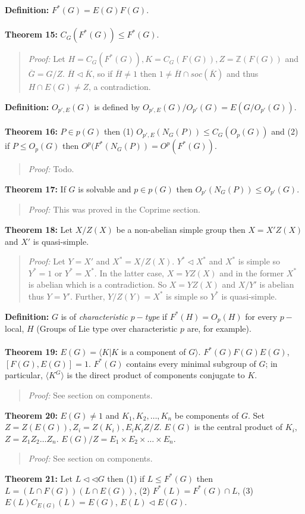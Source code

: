 {\bf Definition:} $F^*(G)= E(G)F(G)$.
\\
\\
{\bf Theorem 15:} $C_G(F^*(G)) \le F^*(G)$.
\begin{quote}
\emph{Proof:}
Let $H=C_G(F^*(G)), K= C_G(F(G)), Z= {\mathbb Z}(F(G))$ and ${\overline G}= G/Z$.
${\overline H} \lhd {\overline K}$, so if ${\overline H} \ne 1$ then
$1 \ne {\overline H} \cap soc({\overline K})$ and thus $H \cap E(G) \ne Z$,
a contradiction.
\end{quote}
{\bf Definition:} $O_{p', E}(G)$ is defined by
$O_{p', E}(G)/O_{p'}(G)= E(G/O_{p'}(G))$.
\\
\\
{\bf Theorem 16:} $P \in p(G)$ then 
(1) $O_{p', E}(N_G(P)) \le C_G(O_p(G))$ and
(2) if $P \le O_p(G)$ then $O^p(F^*(N_G(P))= O^p(F^*(G))$.
\begin{quote}
\emph{Proof:}
Todo.
\end{quote}
{\bf Theorem 17:} If $G$ is solvable and $p \in p(G)$ then $O_{p'}(N_G(P)) \le O_{p'}(G)$.
\begin{quote}
\emph{Proof:} This was proved in the Coprime section.
\end{quote}
{\bf Theorem 18:}
Let $X/Z(X)$ be a non-abelian simple group then $X=X'Z(X)$ and $X'$ is
quasi-simple.
\begin{quote}
\emph{Proof:}
Let $Y=X'$ and $X^*= X/Z(X)$.  $Y^* \lhd X^*$ and $X^*$ is simple so $Y^*=1$ or
$Y^*=X^*$.  In the latter case, $X=YZ(X)$ and in the former $X^*$ is abelian which is a contradiction.
So $X=Y Z(X)$ and $X/Y'$ is abelian thus $Y=Y'$.  Further, $Y/Z(Y)= X^*$ is simple so $Y^*$ is quasi-simple.
\end{quote}
{\bf Definition:} $G$ is of 
\emph{ characteristic $p-$type}
if  $F^*(H)=O_p(H)$ for every $p-$local, $H$ (Groups of Lie type over characteristic
$p$ are, for example).
\\
\\
{\bf Theorem 19:} $E(G)= \langle K | K$ is a component of $G \rangle $.  
$F^*(G) F(G)E(G)$, $[F(G), E(G)]=1$.
$F^*(G)$ contains every minimal subgroup of $G$; in particular, $ \langle K^G \rangle $ is the
direct product of components conjugate to $K$.
\begin{quote}
\emph{Proof:}
See section on components.
\end{quote}
{\bf Theorem 20:} $E(G) \ne 1$ and $K_1 , K_2 , \ldots , K_n$ be components of $G$. Set
$Z=Z(E(G)), Z_i= Z(K_i), E_i K_i Z /Z$.  $E(G)$ is the central product of $K_i$,
$Z= Z_1 Z_2 \ldots Z_n$.  $E(G)/Z= E_1 \times E_2 \times \ldots \times E_n$.
\begin{quote}
\emph{Proof:}
See section on components.
\end{quote}
{\bf Theorem 21:}  Let $L \lhd \lhd G$ then 
(1) if $L \le F^*(G)$ then $L= (L \cap F(G)) (L \cap E(G))$,
(2) $F^*(L) = F^*(G) \cap L$,
(3) $E(L) C_{E(G)}(L) =E(G)$, $E(L) \lhd E(G)$.
